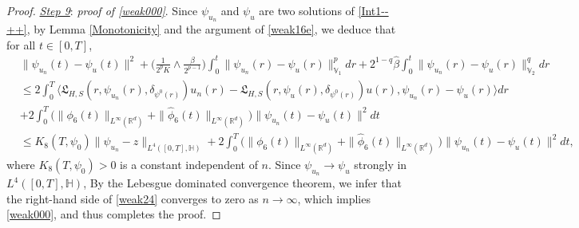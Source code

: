 \documentclass[11pt]{article}
\renewcommand{\leq}{\leqslant}
\numberwithin{equation}{section}
\begin{document}
\begin{proof}
\underline{\emph{Step 9}}: \emph{proof of  \eqref{weak000}}. Since  $\psi_{u_n}$ and $\psi_u$
are two solutions of \eqref{Int1--++},   by
 Lemma \ref{Monotonicity} and the argument of
  \eqref{weak16e}, we deduce that for all $t\in[0,T]$,
\begin{align}\label{weak24}&\|\psi_{u_n}(t)-
\psi_u(t)
\|^2+\Big(\frac{1}{2^pK}\wedge\frac{\beta}{2^{p-1}}
\Big)\int_0^t\|\psi_{u_n}(r)-
\psi_u(r)\|^p_{\mathbb{V}_1}dr
+2^{1-q}\widehat{\beta}
\int_0^t\|\psi_{u_n}(r)-
\psi_u(r)\|_{\mathbb{V}_2}^{q}dr
\nonumber\\&\leq
2\int_0^T\langle
    \mathfrak{L}_{H,S}(r,\psi_{u_n}(r),
\delta_{\psi^0(r)})u_n(r) - \mathfrak{L}_{H,S}(r,\psi_{u}(r),
\delta_{\psi^0(r)})u(r) ,\psi_{u_n}(r)-
\psi_u(r)
\rangle dr
\nonumber\\&+
2 \int_0^T
\big(\|\phi_6 (t)\| _{L^\infty(\mathbb{R}^d)}+
\|\widehat{\phi}_6 (t) \|_{ L^\infty(\mathbb{R}^d)}\big)
\|\psi_{u_n} (t) -
\psi_u  (t)
\|^2 dt
\nonumber\\&\leq K_8(T,\psi_0)
\|\psi_{u_n}
-z\|_{L^4([0,T],\mathbb{H})}
+
2 \int_0^T
\big(\|\phi_6 (t)\| _{L^\infty(\mathbb{R}^d)}+
\|\widehat{\phi}_6 (t) \|_{ L^\infty(\mathbb{R}^d)}\big)
\|\psi_{u_n} (t) -
\psi_u  (t)
\|^2 dt  ,
\end{align}
where $K_8(T,\psi_0)>0$ is a constant independent of $n$.
Since
$\psi_{u_n}\rightarrow \psi_{u}$ strongly in $L^{4}([0,T],\mathbb{H})$, By the Lebesgue
dominated convergence theorem, we infer that
the right-hand side of \eqref{weak24} converges
to zero as $n\to \infty$,
which implies
  \eqref{weak000},
  and thus completes the proof.
\end{proof}
\end{document}
